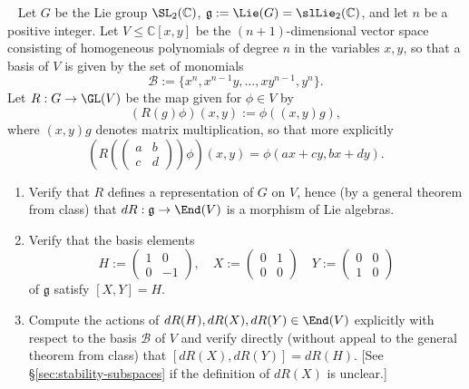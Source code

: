 \documentclass[reqno]{amsart} 
\begin{document}
\begin{homework}\label{hw:sl2-rep-verify-commutator}
~
  Let $G$ be the Lie group $\SL_2(\mathbb{C})$, $\mathfrak{g} := \Lie(G) = \slLie_2(\mathbb{C})$, and let $n$ be a positive integer.  Let $V \leq \mathbb{C}[x,y]$ be the $(n+1)$-dimensional vector space consisting of homogeneous polynomials of degree $n$ in the variables $x,y$, so that a basis of $V$ is given by the set of monomials
  \begin{equation*}
    \mathcal{B} := \{x^n, x^{n-1} y, \dotsc, x y^{n-1}, y^n\}.
  \end{equation*}
  Let $R : G \rightarrow \GL(V)$ be the map given for $\phi \in V$ by
  \begin{equation*}
    (R(g) \phi)(x,y) := \phi((x,y) g),
  \end{equation*}
  where $(x,y) g$ denotes matrix multiplication, so that more explicitly
  \begin{equation*}
    (R( 
\begin{pmatrix}
      a & b \\
      c & d
    \end{pmatrix}
 )
    \phi)(x,y)
    =
    \phi (a x + c y, b x + d y).
  \end{equation*}
  \begin{enumerate}
  \item Verify that $R$ defines a representation of $G$ on $V$, hence (by a general theorem from class) that $d R : \mathfrak{g} \rightarrow \End(V)$ is a morphism of Lie algebras.
  \item Verify that the basis elements
    \begin{equation*}
      H := 
\begin{pmatrix}
        1 & 0 \\
        0 & -1
      \end{pmatrix}
,
      \quad
      X :=
      \begin{pmatrix}
        0 & 1 \\
        0 & 0
      \end{pmatrix}
      \quad Y :=
      \begin{pmatrix}
        0 & 0 \\
        1 & 0
      \end{pmatrix}
    \end{equation*}
    of $\mathfrak{g}$ satisfy $[X,Y] = H$.
  \item Compute the actions of $d R(H), d R(X), d R(Y)\in \End(V)$ explicitly with respect to the basis $\mathcal{B}$ of $V$ and verify directly (without appeal to the general theorem from class) that $[d R(X), d R(Y)] = d R(H)$.  [See \S\ref{sec:stability-subspaces} if the definition of $d R(X)$ is unclear.]
  \end{enumerate}
\end{homework}
\end{document}

